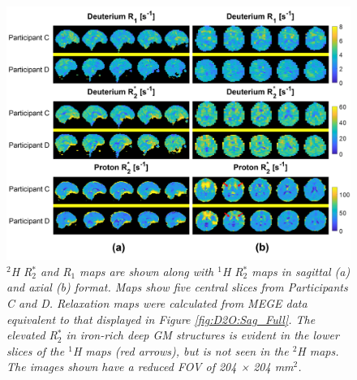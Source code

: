 \begin{figure}[H]
    \centering
    \includegraphics[width=1\textwidth]{Figures/D2O/R1_R2.png}
    \caption{\textit{$^2$H R$_2^*$ and R$_1$ maps are shown along with $^1$H R$_2^*$ maps in sagittal (a) and axial (b) format. Maps show five central slices from Participants C and D. Relaxation maps were calculated from MEGE data equivalent to that displayed in Figure \ref{fig:D2O:Sag_Full}. The elevated R$_2^*$ in iron-rich deep GM structures is evident in the lower slices of the $^1$H maps (red arrows), but is not seen in the $^2$H maps. The images shown have a reduced FOV of 204 × 204 mm$^2$.}}
    \label{fig:D2O:R1_R2}
\end{figure}


